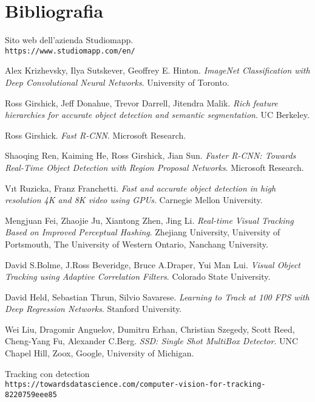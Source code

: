 \section{Bibliografia}

\begin{thebibliography}{99}

Sito web dell'azienda Studiomapp.
\\\texttt{https://www.studiomapp.com/en/}
 
Alex Krizhevsky, Ilya Sutskever, Geoffrey E. Hinton.
\textit{ImageNet Classification with Deep Convolutional
Neural Networks}. University of Toronto. 
 
Ross Girshick, Jeff Donahue, Trevor Darrell, Jitendra Malik.
\textit{Rich feature hierarchies for accurate object detection and semantic segmentation}. UC Berkeley.

Ross Girshick.
\textit{Fast R-CNN}. Microsoft Research. 
 
Shaoqing Ren, Kaiming He, Ross Girshick, Jian Sun.
\textit{Faster R-CNN: Towards Real-Time Object Detection
with Region Proposal Networks}. Microsoft Research.
 
Vıt Ruzicka, Franz Franchetti.
\textit{Fast and accurate object detection in high resolution 4K and 8K video using GPUs}. Carnegie Mellon University.

Mengjuan Fei, Zhaojie Ju, Xiantong Zhen, Jing Li.
\textit{Real-time Visual Tracking Based on Improved Perceptual Hashing}. Zhejiang University, University of Portsmouth, The University of Western Ontario, Nanchang University.

David S.Bolme, J.Ross Beveridge, Bruce A.Draper, Yui Man Lui.
\textit{Visual Object Tracking using Adaptive Correlation Filters}. Colorado State University.

David Held, Sebastian Thrun, Silvio Savarese.
\textit{Learning to Track at 100 FPS with Deep Regression Networks}. Stanford University.

Wei Liu, Dragomir Anguelov, Dumitru Erhan, Christian Szegedy, Scott Reed, Cheng-Yang Fu, Alexander C.Berg.
\textit{SSD: Single Shot MultiBox Detector}. UNC Chapel Hill, Zoox, Google, University of Michigan.

Tracking con detection
\\\texttt{https://towardsdatascience.com/computer-vision-for-tracking-8220759eee85}


\end{thebibliography}
